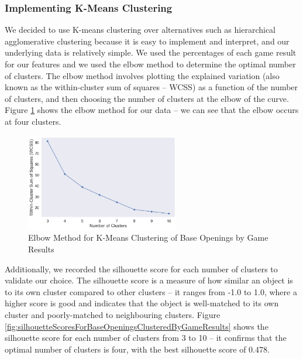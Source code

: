 \documentclass[a4paper, 11pt]{article}
\begin{document}
\subsubsection{Implementing K-Means Clustering}
We decided to use K-means clustering over alternatives such as hierarchical agglomerative clustering because it is easy to implement and interpret, and our underlying data is relatively simple. We used the percentages of each game result for our features and we used the elbow method to determine the optimal number of clusters. The elbow method involves plotting the explained variation (also known as the within-cluster sum of squares -- WCSS) as a function of the number of clusters, and then choosing the number of clusters at the elbow of the curve. Figure \ref{fig:elbowMethodForBaseOpeningsClusteredByGameResults} shows the elbow method for our data -- we can see that the elbow occurs at four clusters.

\begin{figure}[H]
    \centering
    \caption{Elbow Method for K-Means Clustering of Base Openings by Game Results}
    \label{fig:elbowMethodForBaseOpeningsClusteredByGameResults}
    \includegraphics[width=0.6\textwidth]{Elbow Method for Clustering of Base Opening by Results.png}
\end{figure}

Additionally, we recorded the silhouette score for each number of clusters to validate our choice. The silhouette score is a measure of how similar an object is to its own cluster compared to other clusters -- it ranges from -1.0 to 1.0, where a higher score is good and indicates that the object is well-matched to its own cluster and poorly-matched to neighbouring clusters. Figure \ref{fig:silhouetteScoresForBaseOpeningsClusteredByGameResults} shows the silhouette score for each number of clusters from 3 to 10 -- it confirms that the optimal number of clusters is four, with the best silhouette score of 0.478.
\end{document}
